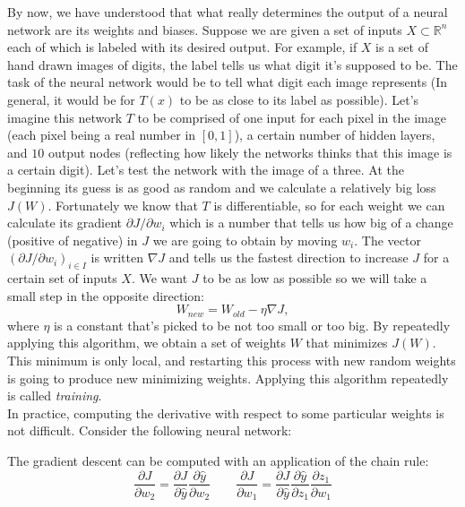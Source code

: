 \documentclass{article}
\newcommand{\R}{\mathbb{R}}
\theoremstyle{plain}
\theoremstyle{definition}
\theoremstyle{remark}
\begin{document}
By now, we have understood that what really determines the output of a neural network are its weights and biases. Suppose we are given a set of inputs $X \subset \R^n$ each of which is labeled with its desired output. For example, if $X$ is a set of hand drawn images of digits, the label tells us what digit it's supposed to be. The task of the neural network would be to tell what digit each image represents (In general, it would be for $T(x)$ to be as close to its label as possible). Let's imagine this network $T$ to be comprised of one input for each pixel in the image (each pixel being a real number in $[0,1]$), a certain number of hidden layers, and $10$ output nodes (reflecting how likely the networks thinks that this image is a certain digit). Let's test the network with the image of a three. At the beginning its guess is as good as random and we calculate a relatively big loss $J(W)$. Fortunately we know that $T$ is differentiable, so for each weight we can calculate its gradient $\partial J / \partial w_i$ which is a number that tells us how big of a change (positive of negative) in $J$ we are going to obtain by moving $w_i$. The vector $(\partial J / \partial w_i)_{i\in I}$ is written $\nabla J$ and tells us the fastest direction to increase $J$ for a certain set of inputs $X$. We want $J$ to be as low as possible so we will take a small step in the opposite direction: \[W_{new}= W_{old} - \eta \nabla J, \] where $\eta$ is a constant that's picked to be not too small or too big. By repeatedly applying this algorithm, we obtain a set of weights $W$ that minimizes $J(W)$. This minimum is only local, and restarting this process with new random weights is going to produce new minimizing weights. Applying this algorithm repeatedly is called \emph{training}.\\	In practice, computing the derivative with respect to some particular weights is not difficult. Consider the following neural network: \\
		\begin{center}
		\end{center}
The gradient descent can be computed with an application of the chain rule:\[
\frac{\partial J}{\partial w_2} =\frac{\partial J}{\partial \hat{y}} \frac{\partial \hat{y}}{\partial w_2} \qquad
\frac{\partial J}{\partial w_1} = \frac{\partial J}{\partial \hat{y}}\frac{\partial \hat{y}}{\partial z_1}\frac{\partial z_1}{\partial w_1} \]
\end{document}
